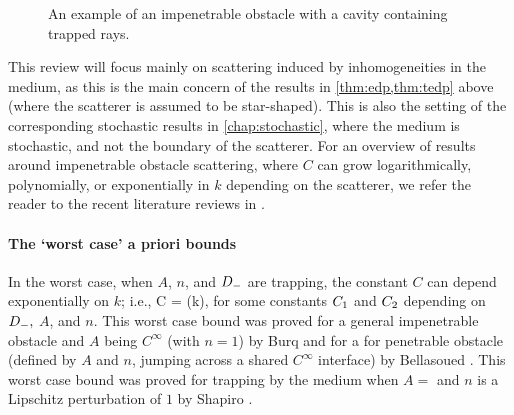 \begin{figure}
\centering
\begin{tikzpicture}[scale=2]

\end{tikzpicture}
\caption{An example of an impenetrable obstacle with a cavity containing trapped rays.}\label{fig:trapping}
\end{figure}


This review will focus mainly on scattering induced by inhomogeneities in the medium, as this is the main concern of the results in \cref{thm:edp,thm:tedp} above (where the scatterer is assumed to be star-shaped). This is also the setting of the corresponding stochastic results in \cref{chap:stochastic}, where the medium is stochastic, and not the boundary of the scatterer. For an overview of results around impenetrable obstacle scattering, where $C$ can grow logarithmically, polynomially, or exponentially in $k$ depending on the scatterer, we refer the reader to the recent literature reviews in \cite[Sections 1.1 and 1.3]{ChSpGiSm:17}. %

\paragraph{The `worst case' a priori bounds} In the worst case, when $A$, $n$, and $\Dm$ are trapping, the constant $C$ can depend exponentially on $k$; i.e.,
\beq\label{eq:expbound}
C = \Co \exp(k\Ct),
\eeq
for some constants $\Co$ and $\Ct$ depending on $\Dm, $ $A$, and $n$. This worst case bound was proved for a general impenetrable obstacle and $A$ being $C^\infty$  (with $n=1$) by Burq \cite{Bu:98} and for a for penetrable obstacle (defined by $A$ and $n$, jumping across a shared $C^\infty$ interface) by  Bellasoued \cite{Be:03}. This worst case bound was proved for trapping by the medium when $A=$ and $n$ is a Lipschitz perturbation of $1$ by Shapiro \cite{Sh:18}.%


